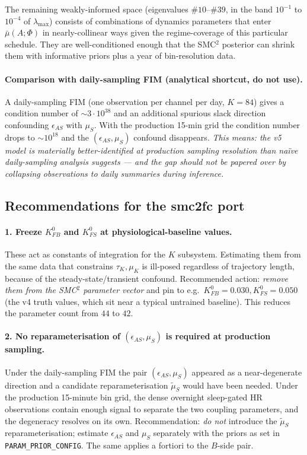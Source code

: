 The remaining weakly-informed space (eigenvalues $\#10$--$\#39$, in the band $10^{-1}$ to $10^{-4}$ of $\lambda_{\max}$) consists of combinations of dynamics parameters that enter $\bar\mu(A;\Phi)$ in nearly-collinear ways given the regime-coverage of this particular schedule. They are well-conditioned enough that the SMC$^2$ posterior can shrink them with informative priors plus a year of bin-resolution data.

\paragraph{Comparison with daily-sampling FIM (analytical shortcut, do not use).}
A daily-sampling FIM (one observation per channel per day, $K = 84$) gives a condition number of $\sim 3 \cdot 10^{38}$ and an additional spurious slack direction confounding $\epsilon_{AS}$ with $\mu_S$. With the production 15-min grid the condition number drops to $\sim 10^{18}$ and the $(\epsilon_{AS}, \mu_S)$ confound disappears. \emph{This means: the v5 model is materially better-identified at production sampling resolution than na\"ive daily-sampling analysis suggests --- and the gap should not be papered over by collapsing observations to daily summaries during inference.}

\subsection{Recommendations for the smc2fc port} \label{sec:fim-recommendations}

\paragraph{1. Freeze $K_{FB}^0$ and $K_{FS}^0$ at physiological-baseline values.}
These act as constants of integration for the $K$ subsystem. Estimating them from the same data that constrains $\tau_K, \mu_K$ is ill-posed regardless of trajectory length, because of the steady-state/transient confound. Recommended action: \emph{remove them from the SMC$^2$ parameter vector} and pin to e.g.\ $K_{FB}^0 = 0.030, K_{FS}^0 = 0.050$ (the v4 truth values, which sit near a typical untrained baseline). This reduces the parameter count from $44$ to $42$.

\paragraph{2. No reparameterisation of $(\epsilon_{AS}, \mu_S)$ is required at production sampling.}
Under the daily-sampling FIM the pair $(\epsilon_{AS}, \mu_S)$ appeared as a near-degenerate direction and a candidate reparameterisation $\widetilde\mu_S$ would have been needed. Under the production 15-minute bin grid, the dense overnight sleep-gated HR observations contain enough signal to separate the two coupling parameters, and the degeneracy resolves on its own. Recommendation: \emph{do not} introduce the $\widetilde\mu_S$ reparameterisation; estimate $\epsilon_{AS}$ and $\mu_S$ separately with the priors as set in \texttt{PARAM\_PRIOR\_CONFIG}. The same applies a fortiori to the $B$-side pair.

